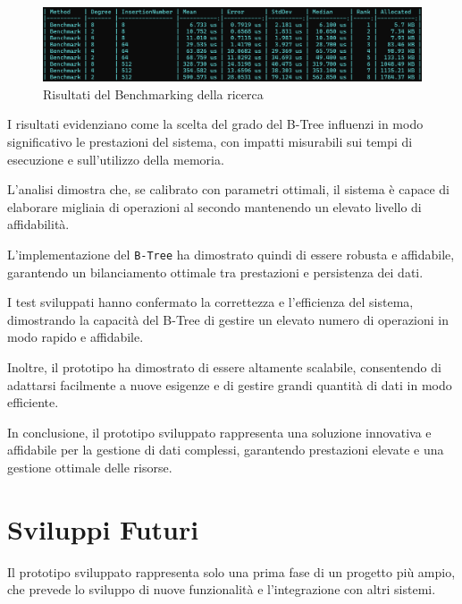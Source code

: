 \documentclass[12pt,a4paper,openright,twoside]{book}
\begin{document}
        \begin{figure} [h]
            \centering
            \includegraphics[width=1\linewidth]{figures/BenchmarkSearch.png}
            \caption{Risultati del Benchmarking della ricerca}
            \label{fig:benchmarkC}
        \end{figure}

        \clearpage

        I risultati evidenziano come la scelta del grado del B-Tree influenzi in modo significativo le prestazioni del sistema, con impatti misurabili sui tempi di esecuzione e sull'utilizzo della memoria.

        L'analisi dimostra che, se calibrato con parametri ottimali, il sistema è capace di elaborare migliaia di operazioni al secondo mantenendo un elevato livello di affidabilità.

        L'implementazione del \texttt{B-Tree} ha dimostrato quindi di essere robusta e affidabile, garantendo un bilanciamento ottimale tra prestazioni e persistenza dei dati.

        I test sviluppati hanno confermato la correttezza e l'efficienza del sistema, dimostrando la capacità del B-Tree di gestire un elevato numero di operazioni in modo rapido e affidabile.

        Inoltre, il prototipo ha dimostrato di essere altamente scalabile, consentendo di adattarsi facilmente a nuove esigenze e di gestire grandi quantità di dati in modo efficiente.

        In conclusione, il prototipo sviluppato rappresenta una soluzione innovativa e affidabile per la gestione di dati complessi, garantendo prestazioni elevate e una gestione ottimale delle risorse.

        \clearpage

    \section{Sviluppi Futuri}

        Il prototipo sviluppato rappresenta solo una prima fase di un progetto più ampio, che prevede lo sviluppo di nuove funzionalità e l'integrazione con altri sistemi.
\end{document}

